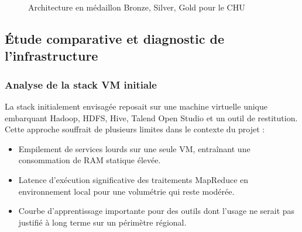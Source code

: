 \documentclass[12pt, a4paper]{report}
\begin{document}
\begin{figure}[H]
  \centering
  \caption{Architecture en médaillon Bronze, Silver, Gold pour le CHU}
\end{figure}

\subsection{Étude comparative et diagnostic de l'infrastructure}

\subsubsection{Analyse de la stack VM initiale}

La stack initialement envisagée reposait sur une machine virtuelle unique embarquant Hadoop, HDFS, Hive, Talend Open Studio et un outil de restitution. Cette approche souffrait de plusieurs limites dans le contexte du projet :

\begin{itemize}[label=\textcolor{chuBlue}{\textbullet}]
  \item Empilement de services lourds sur une seule VM, entraînant une consommation de RAM statique élevée.
  \item Latence d'exécution significative des traitements MapReduce en environnement local pour une volumétrie qui reste modérée.
  \item Courbe d'apprentissage importante pour des outils dont l'usage ne serait pas justifié à long terme sur un périmètre régional.
\end{itemize}
\end{document}
